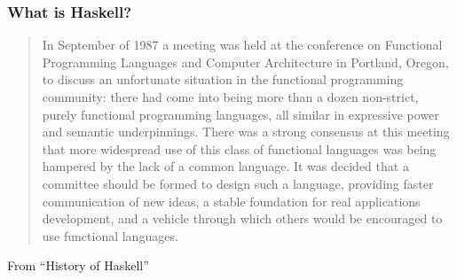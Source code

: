 \documentclass{beamer}
\begin{document}
\begin{frame}
  \frametitle{What is Haskell?}
  \begin{quotation}
    In September of 1987 a meeting was held at the conference on
    Functional Programming Languages and Computer Architecture in
    Portland, Oregon, to discuss an unfortunate situation in the
    functional programming community: there had come into being more
    than a dozen non-strict, purely functional programming languages,
    all similar in expressive power and semantic underpinnings. There
    was a strong consensus at this meeting that more widespread use
    of this class of functional languages was being hampered by the
    lack of a common language. It was decided that a committee should
    be formed to design such a language, providing faster
    communication of new ideas, a stable foundation for real
    applications development, and a vehicle through which others would 
    be encouraged to use functional languages. 
  \end{quotation}
  {\tiny From ``History of Haskell''}
\end{frame}
\end{document}

